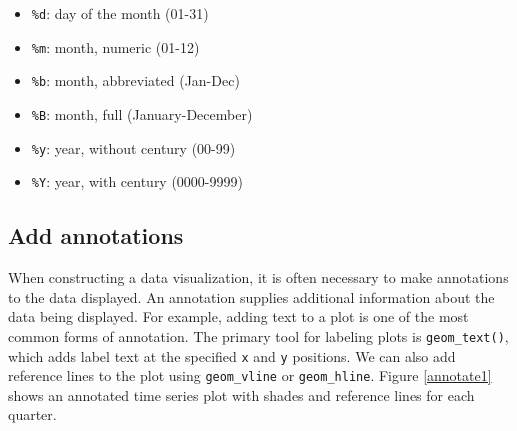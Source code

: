 \documentclass[]{book}
\providecommand{\tightlist}{%
  \setlength{\itemsep}{0pt}\setlength{\parskip}{0pt}}
\begin{document}
\begin{itemize}
\tightlist
\item
  \texttt{\%d}: day of the month (01-31)
\item
  \texttt{\%m}: month, numeric (01-12)
\item
  \texttt{\%b}: month, abbreviated (Jan-Dec)
\item
  \texttt{\%B}: month, full (January-December)
\item
  \texttt{\%y}: year, without century (00-99)
\item
  \texttt{\%Y}: year, with century (0000-9999)
\end{itemize}

\subsection{Add annotations}\label{add-annotations}

When constructing a data visualization, it is often necessary to make
annotations to the data displayed. An annotation supplies additional
information about the data being displayed. For example, adding text to
a plot is one of the most common forms of annotation. The primary tool
for labeling plots is \texttt{geom\_text()}, which adds label text at
the specified \texttt{x} and \texttt{y} positions. We can also add
reference lines to the plot using \texttt{geom\_vline} or
\texttt{geom\_hline}. Figure \ref{annotate1} shows an annotated time
series plot with shades and reference lines for each quarter.
\end{document}

